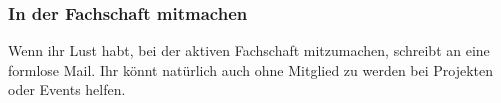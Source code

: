 \subsubsection{In der Fachschaft mitmachen}
Wenn ihr Lust habt, bei der aktiven Fachschaft mitzumachen, schreibt 
an  eine formlose Mail. Ihr könnt 
natürlich auch ohne Mitglied zu werden bei Projekten oder Events 
helfen. 